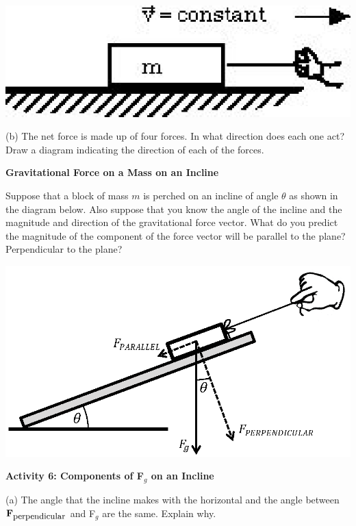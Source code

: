 \vspace{0.3cm}
{\par\raggedright \includegraphics{newton/newton_fig9.eps} \par}
\vspace{0.3cm}

(b) The net force is made up of four forces.  
In what direction does each one act? Draw a
diagram indicating the direction of each of the forces.
\answerspace{20mm}

\pagebreak[2]
\textbf{Gravitational Force on a Mass on an Incline }

Suppose that a block of mass $m$ is perched on an incline of angle \( \theta  \)
as shown in the diagram below. Also suppose that you know the angle of the incline
and the magnitude and direction of the gravitational force vector. What do you
predict the magnitude of the component of the force vector will be parallel
to the plane? Perpendicular to the plane?

\vspace{0.3cm}
{\par\centering \includegraphics{newton/newton_fig10_new.eps} \par}
\vspace{0.3cm}

\textbf{Activity 6: Components of F\( _{g} \) on an Incline }

(a) The angle that the incline makes with the horizontal and the angle between
\( {\bf F}_{{\mbox{\small perpendicular}}} \) and F\( _{g} \) are the same. Explain why.
\vspace{20mm}

